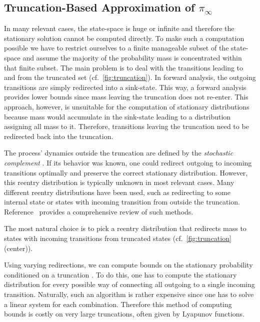 \subsection{Truncation-Based Approximation of $\pi_{\infty}$}\label{sec:statagg:fsp}
In many relevant cases, the state-space is huge or infinite and therefore the stationary solution cannot be computed directly.
To make such a computation possible we have to restrict ourselves to a finite manageable subset of the state-space and assume the majority of the probability mass is concentrated within that finite subset.
The main problem is to deal with the transitions leading to and from the truncated set (cf.\ \autoref{fig:truncation}).
In forward analysis, the outgoing transitions are simply redirected into a sink-state.
This way, a forward analysis provides lower bounds since mass leaving the truncation does not re-enter.
This approach, however, is unsuitable for the computation of stationary distributions because mass would accumulate in the sink-state leading to a distribution assigning all mass to it.
Therefore, transitions leaving the truncation need to be redirected back into the truncation.

The process' dynamics outside the truncation are defined by the \emph{stochastic complement} \cite{spieler2014numerical}.
If its behavior was known, one could redirect outgoing to incoming transitions optimally and preserve the correct stationary distribution.
However, this reentry distribution is typically unknown in most relevant cases.
Many different reentry distributions have been used, such as redirecting to some internal state or states with incoming transition from outside the truncation.
Reference~\cite{kuntz2021approximations} provides a comprehensive review of such methods.

The most natural choice is to pick a reentry distribution that redirects mass to states with incoming transitions from truncated states (cf.\ \autoref{fig:truncation} (center)).

Using varying redirections, we can compute bounds on the stationary probability conditioned on a truncation \cite[(Thm. 14)]{spieler2014numerical}.
To do this, one has to compute the stationary distribution for every possible way of connecting all outgoing to a single incoming transition.
Naturally, such an algorithm is rather expensive since one has to solve a linear system for each combination.
Therefore this method of computing bounds is costly on very large truncations, often given by Lyapunov functions.

